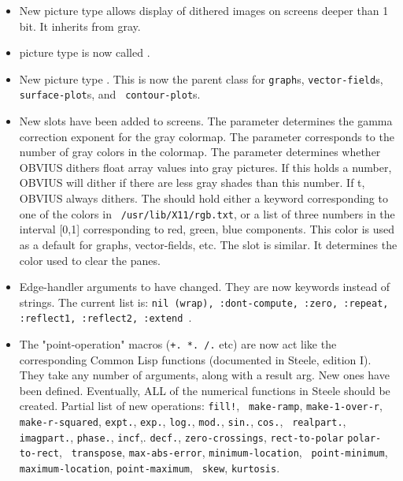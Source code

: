 \begin{itemize}
\item New picture type  allows display of dithered images
on screens deeper than 1 bit.  It inherits from gray.

\item {} picture type is now called .

\item New picture type .  This is now the parent class
for {\tt graph}s, {\tt vector-field}s, {\tt surface-plot}s, and {\tt
contour-plot}s.

\item New slots have been added to screens.  The  parameter
determines the gamma correction exponent for the gray colormap.  The
 parameter corresponds to the number of gray colors in the
colormap.  The  parameter determines whether OBVIUS dithers
float array values into gray pictures.  If this holds a number, OBVIUS
will dither if there are less gray shades than this number.  If t,
OBVIUS always dithers.  The  should hold either a
keyword corresponding to one of the colors in {\tt
/usr/lib/X11/rgb.txt}, or a list of three numbers in the interval
[0,1] corresponding to red, green, blue components.  This color is
used as a default for graphs, vector-fields, etc.  The
 slot is similar.  It determines the color used to
clear the panes.

\item Edge-handler arguments to  have changed.  They are now
keywords instead of strings.  The current list is: {\tt nil (wrap),
:dont-compute, :zero, :repeat, :reflect1, :reflect2, :extend }.

\item The "point-operation"  
macros ({\tt +. *. /.} etc) are now act like the corresponding Common
Lisp functions (documented in Steele, edition I).  They take any
number of arguments, along with a result arg.  New ones have been
defined.  Eventually, ALL of the numerical functions in Steele should
be created.  Partial list of new operations: {\tt fill!}, {\tt
make-ramp}, {\tt make-1-over-r}, {\tt make-r-squared}, {\tt expt.},
{\tt exp.}, {\tt log.}, {\tt mod.}, {\tt sin.}, {\tt cos.}, {\tt
realpart.}, {\tt imagpart.}, {\tt phase.}, {\tt incf},. {\tt decf.},
{\tt zero-crossings}, {\tt rect-to-polar} {\tt polar-to-rect}, {\tt
transpose}, {\tt max-abs-error}, {\tt minimum-location}, {\tt
point-minimum}, {\tt maximum-location}, {\tt point-maximum}, {\tt
skew}, {\tt kurtosis}.


\end{itemize}

